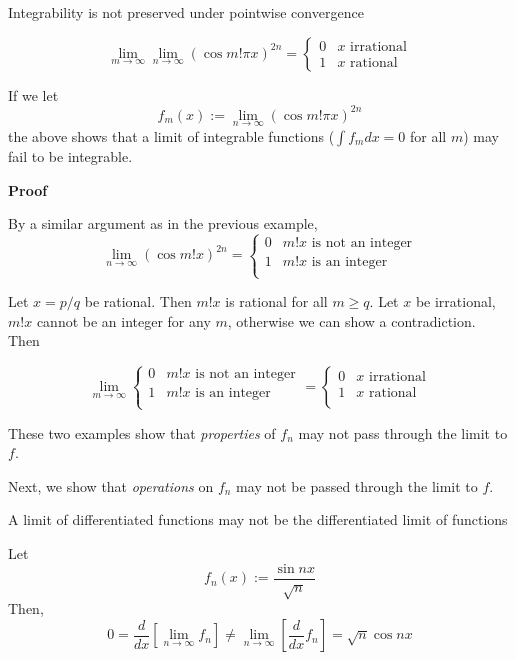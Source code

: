 \begin{example}Integrability is not preserved under pointwise convergence

    \[\lim_{m \to \infty} \lim_{n \to \infty} (\cos m!\pi x ) ^{2n} = \begin{cases}
        0 & x\text{ irrational} \\
        1 & x\text{ rational}
    \end{cases}\]

    If we let 
    \[f_m (x) := \lim_{n \to \infty} (\cos m!\pi x)^{2n}\]
    the above shows that a limit of integrable functions ($\int f_m dx = 0$ for all $m$) may fail to be integrable.

    \textbf{Proof}

    By a similar argument as in the previous example,
    \[\lim_{n \to \infty} (\cos m!x)^{2n} = \begin{cases}
        0 & m!x\text{ is not an integer} \\
        1 & m!x\text{ is an integer} \\
    \end{cases}\]

    Let $x = p/q$ be rational. Then $m!x$ is rational for all $m \geq q$. Let $x$ be irrational, $m!x$ cannot be an integer for any $m$, otherwise we can show a contradiction. Then

    \[\lim_{m \to \infty} \begin{cases}
        0 & m!x\text{ is not an integer} \\
        1 & m!x\text{ is an integer} \\
        \end{cases} = \begin{cases}
        0 & x \text{ irrational} \\
        1 & x \text{ rational} \\
    \end{cases}\]
\end{example} 

These two examples show that \textit{properties} of $f_n$ may not pass through the limit to $f$. 

Next, we show that \textit{operations} on $f_n$ may not be passed through the limit to $f$.

\begin{example} A limit of differentiated functions may not be the differentiated limit of functions

    Let 
    \[f_n(x) := \frac{\sin nx}{\sqrt{n}}\]
    Then,
    \[0 = \frac{d}{dx}\left[\lim_{n \to \infty} f_n \right]\neq \lim_{n \to \infty} \left[\frac{d}{dx} f_n\right] = \sqrt{n}\cos nx\]
\end{example}

